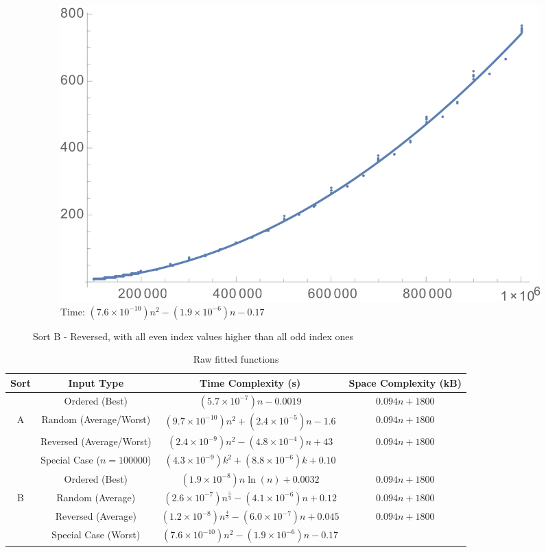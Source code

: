 \documentclass[a4paper]{scrartcl}
\begin{document}
\begin{figure}[p]
    \centering
    \begin{subfigure}[b]{0.45\textwidth}
        \includegraphics[width = \textwidth]{sortB_special_time.png}
        \caption{Time: \((7.6 \times 10^{-10}) n^2 - (1.9 \times 10^{-6}) n - 0.17\)}
    \end{subfigure}
    \caption{Sort B - Reversed, with all even index values higher than all odd index ones}
    \label{fig:sortB_special}
\end{figure}

\begin{table}
    \centering
    \begin{tabular}{c | c | c | c}
        Sort & Input Type & Time Complexity (s) & Space Complexity (kB) \\
        \hline
        & Ordered (Best) & \((5.7 \times 10^{-7}) n - 0.0019\) & \(0.094 n + 1800\) \\
        A & Random (Average/Worst) & \((9.7 \times 10^{-10}) n^2 + (2.4 \times 10^{-5}) n - 1.6\) & \(0.094 n + 1800\) \\
        & Reversed (Average/Worst) & \((2.4 \times 10^{-9}) n^2 - (4.8 \times 10^{-4}) n + 43\) & \(0.094 n + 1800\) \\
        & Special Case (\(n = 100000\)) & \((4.3 \times 10^{-9}) k^2 + (8.8 \times 10^{-6}) k + 0.10\) & \\
        \hline
        & Ordered (Best) & \((1.9 \times 10^{-8}) n \ln{(n)} + 0.0032\) & \(0.094 n + 1800\) \\
        B & Random (Average) & \((2.6 \times 10^{-7}) n^\frac54 - (4.1 \times 10^{-6}) n + 0.12\) & \(0.094 n + 1800\) \\
        & Reversed (Average) & \((1.2 \times 10^{-8}) n^\frac43 - (6.0 \times 10^{-7}) n + 0.045\) & \(0.094 n + 1800\) \\
        & Special Case (Worst) & \((7.6 \times 10^{-10}) n^2 - (1.9 \times 10^{-6}) n - 0.17\) &
    \end{tabular}
    \caption{Raw fitted functions}
    \label{tab:raw_fit}
\end{table}
\end{document}
